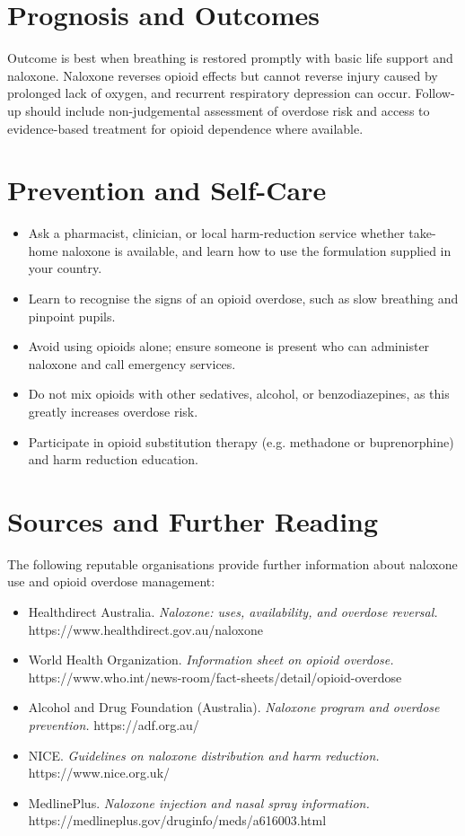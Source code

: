 \section*{Prognosis and Outcomes}
Outcome is best when breathing is restored promptly with basic life support and naloxone. Naloxone reverses opioid effects but cannot reverse injury caused by prolonged lack of oxygen, and recurrent respiratory depression can occur. Follow-up should include non-judgemental assessment of overdose risk and access to evidence-based treatment for opioid dependence where available.

\section*{Prevention and Self-Care}
\begin{itemize}
    \item Ask a pharmacist, clinician, or local harm-reduction service whether take-home naloxone is available, and learn how to use the formulation supplied in your country.
    \item Learn to recognise the signs of an opioid overdose, such as slow breathing and pinpoint pupils.
    \item Avoid using opioids alone; ensure someone is present who can administer naloxone and call emergency services.
    \item Do not mix opioids with other sedatives, alcohol, or benzodiazepines, as this greatly increases overdose risk.
    \item Participate in opioid substitution therapy (e.g. methadone or buprenorphine) and harm reduction education.
\end{itemize}

\section*{Sources and Further Reading}
The following reputable organisations provide further information about naloxone use and opioid overdose management:
\begin{itemize}
    \item Healthdirect Australia. \textit{Naloxone: uses, availability, and overdose reversal.} https://www.healthdirect.gov.au/naloxone
    \item World Health Organization. \textit{Information sheet on opioid overdose.} https://www.who.int/news-room/fact-sheets/detail/opioid-overdose
    \item Alcohol and Drug Foundation (Australia). \textit{Naloxone program and overdose prevention.} https://adf.org.au/
    \item NICE. \textit{Guidelines on naloxone distribution and harm reduction.} https://www.nice.org.uk/
    \item MedlinePlus. \textit{Naloxone injection and nasal spray information.} https://medlineplus.gov/druginfo/meds/a616003.html
\end{itemize}
